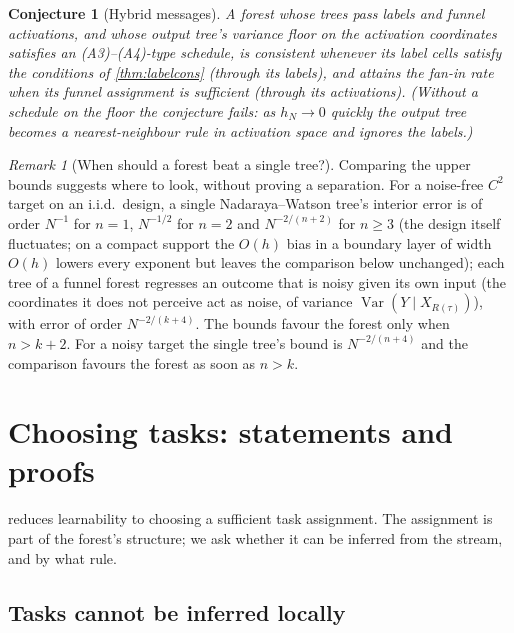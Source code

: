 \documentclass[11pt]{article}
\newtheorem{conjecture}[theorem]{Conjecture}
\theoremstyle{definition}
\theoremstyle{remark}
\newtheorem{remark}[theorem]{Remark}
\newcommand{\Var}{\operatorname{Var}}
\begin{document}
\begin{conjecture}[Hybrid messages]\label{conj:hybrid}
A forest whose trees pass labels and funnel activations, and whose output tree's
variance floor on the activation coordinates satisfies an (A3)--(A4)-type schedule, is
consistent whenever its label cells satisfy the conditions of \cref{thm:labelcons}
(through its labels), and attains the fan-in rate when its funnel assignment is
sufficient (through its activations).  (Without a schedule on the floor the conjecture
fails: as $h_N\to0$ quickly the output tree becomes a nearest-neighbour rule in activation
space and ignores the labels.)
\end{conjecture}

\begin{remark}[When should a forest beat a single tree?]\label{rem:crossover}
Comparing the upper bounds suggests where to look, without proving a separation.  For a
noise-free $C^2$ target on an i.i.d.\ design, a single Nadaraya--Watson tree's interior
error is of order $N^{-1}$ for $n=1$, $N^{-1/2}$ for $n=2$ and $N^{-2/(n+2)}$ for $n\ge3$ (the
design itself fluctuates; on a compact support the $O(h)$ bias in a boundary layer of width
$O(h)$ lowers every exponent but leaves the comparison below unchanged); each tree of a funnel forest regresses an outcome that is noisy given
its own input (the coordinates it does not perceive act as noise, of variance
$\Var(Y\mid X_{R(\tau)})$), with error of order $N^{-2/(k+4)}$.  The bounds favour the
forest only when $n>k+2$.  For a noisy target the single tree's bound is $N^{-2/(n+4)}$
and the comparison favours the forest as soon as $n>k$.
\end{remark}

\section{Choosing tasks: statements and proofs}\label{sec:infer}

 reduces learnability to choosing a sufficient task assignment.  The
assignment is part of the forest's structure; we ask whether it can be inferred from the
stream, and by what rule.

\subsection{Tasks cannot be inferred locally}
\end{document}
